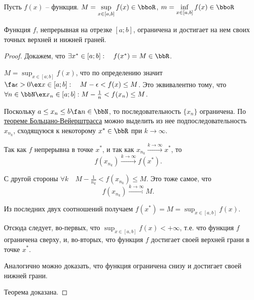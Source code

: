 Пусть $f(x)$ -- функция. $M = \sup_{x \in [a,b]}\limits f(x) \in \bboR$, $m = \inf_{x \in [a,b]}\limits f(x) \in \bboR$
\begin{thm} [Вейерштрасса] \label{ch1n1}
Функция $f$, непрерывная на отрезке $[a;b]$, ограничена и достигает на нем своих точных верхней и нижней граней.
\end{thm}
\begin{proof}
Докажем, что $\exists x^* \in [a;b]:\quad f(x^*)= M \in \bbR$.

$M = \sup_{x \in [a;b]}\limits f(x)$, что по определению значит $\fa \epsilon > 0 \ex x\in [a;b]: \quad M-\epsilon < f(x) \le M $. Это эквивалентно тому, что $\forall n \in \bbN \ex x_n \in [a;b]: M-\frac{1}{n} < f(x_n) \le M $.

Поскольку $ a\le x_n \le b \fa n \in \bbN$, то последовательность $\{x_n\}$ ограничена. По \hyperref[exp9]{теореме Больцано-Вейерштрасса} можно выделить из нее подпоследовательность ${x_{n_k}}$, сходящуюся к некоторому $x^* \in \bbR$ при $k \to \infty$.

Так как $f$ непрерывна в точке $x^*$, и так как $x_{n_k}\xrightarrow{k \to \infty} x^*$, то  
$$
f(x_{n_k}) \xrightarrow{k \to \infty} f(x^*).
$$ 

С другой стороны $\forall k \quad M-\frac{1}{n_k} < f(x_{n_k}) \le M$. Это тоже самое, что
$$
f(x_{n_k}) \xrightarrow{k \to \infty} M.
$$

Из последних двух соотношений получаем $f(x^*) = M = \sup_{x \in [a,b]}\limits f(x) $. 

Отсюда следует, во-первых, что  $\sup_{x \in [a,b]}\limits f(x)<+\infty$, т.е. что функция $f$ ограничена сверху, и, во-вторых, что функция $f$ достигает своей верхней грани в точке $x^*$.

Аналогично можно доказать, что функция ограничена снизу и достигает своей нижней грани.

Теорема доказана.   
\end{proof}